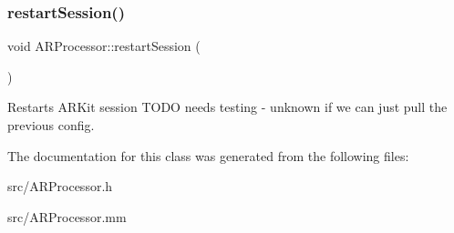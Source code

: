 \subsubsection{\texorpdfstring{restart\+Session()}{restartSession()}}
{\footnotesize\ttfamily void A\+R\+Processor\+::restart\+Session (\begin{DoxyParamCaption}{ }\end{DoxyParamCaption})}

Restarts A\+R\+Kit session T\+O\+DO needs testing -\/ unknown if we can just pull the previous config. 

The documentation for this class was generated from the following files\+:\begin{DoxyCompactItemize}
\item 
src/A\+R\+Processor.\+h\item 
src/A\+R\+Processor.\+mm\end{DoxyCompactItemize}
